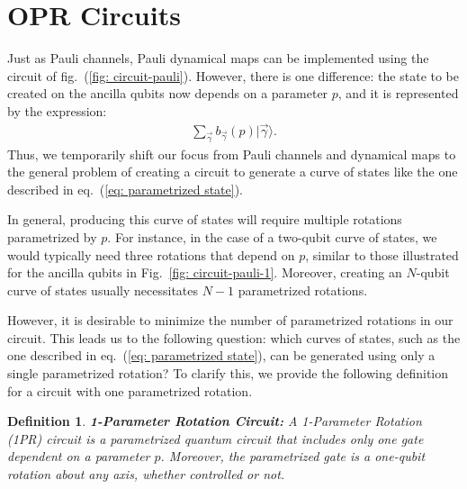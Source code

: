 \documentclass[10pt,letterpaper]{article} %
\newcommand{\fref}[1]{Fig.~\ref{#1}}
\newcommand{\eref}[1]{eq.~(\ref{#1})}
\newtheorem{definition}{Definition}
\begin{document}
\section{OPR Circuits} %
\label{sec: OPR Circuits}


Just as Pauli channels, Pauli dynamical maps can be implemented using the circuit
of fig.~(\ref{fig: circuit-pauli}). However, there is one difference: 
the state to be created on the ancilla qubits now 
depends on a parameter $p$, and it is represented by the expression:
\begin{eqnarray}
\label{eq: parametrized state}
\sum_{\vec{\gamma}} b_{\vec{\gamma}}(p) |\vec{\gamma}\rangle.
\end{eqnarray}
Thus, we temporarily shift our focus from Pauli
channels and dynamical maps to the general problem of 
creating a circuit to generate a curve of
states like the one described in \eref{eq: parametrized state}.

In general, producing this curve of states will require multiple rotations
parametrized by $p$. For instance, in the case of a two-qubit curve of states,
we would typically need three rotations that depend on $p$, similar to those
illustrated for the ancilla qubits in \fref{fig: circuit-pauli-1}.
Moreover, creating an $N$-qubit curve of states
usually necessitates $N-1$ parametrized rotations.

However, it is desirable to minimize the number of parametrized rotations in our circuit.
This leads us to the following question: which curves of states,
such as the one described in \eref{eq: parametrized state}, 
can be generated using only a single parametrized rotation? 
To clarify this, we provide the following definition for a circuit with one parametrized rotation.

\begin{definition}{\textbf{1-Parameter Rotation Circuit:}}
A 1-Parameter Rotation (1PR) circuit is a parametrized quantum
circuit that includes only one gate dependent on a parameter $p$.
Moreover, the parametrized gate is a one-qubit rotation about any axis,
whether controlled or not.
\end{definition}
\end{document}
